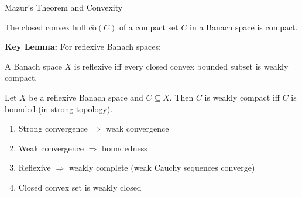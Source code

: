 \documentclass[aspectratio=169,10pt]{beamer}
\begin{document}
\begin{frame}{Mazur's Theorem and Convexity}
  \begin{theorem}
    The closed convex hull $\overline{\text{co}}(C)$ of a compact set $C$ in a Banach space is compact.
  \end{theorem}

  \vspace{0.3cm}
  \textbf{Key Lemma:} For reflexive Banach spaces:

  \begin{theorem}[Theorem 1.30]
    A Banach space $X$ is reflexive iff every closed convex bounded subset is weakly compact.
  \end{theorem}

  \vspace{0.3cm}
  \begin{theorem}[Theorem 1.31]
    Let $X$ be a reflexive Banach space and $C \subseteq X$. Then $C$ is weakly compact iff $C$ is bounded (in strong topology).
  \end{theorem}

  \vspace{0.3cm}
  \begin{observation}
    \begin{enumerate}
      \item Strong convergence $\Rightarrow$ weak convergence
      \item Weak convergence $\Rightarrow$ boundedness
      \item Reflexive $\Rightarrow$ weakly complete (weak Cauchy sequences converge)
      \item Closed convex set is weakly closed
    \end{enumerate}
  \end{observation}
\end{frame}
\end{document}
